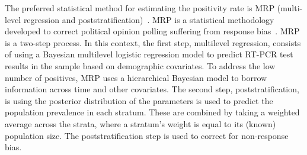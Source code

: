 \documentclass[thesis.tex]{subfiles}
\begin{document}
The preferred statistical method for estimating the positivity rate is MRP (multi-level regression and poststratification)~\autocite{cisMethodsONS,pouwelsCommunity}.
MRP is a statistical methodology developed to correct political opinion polling suffering from response bias~\autocite{gelmanMRT,gelmanPoststratication,parkMRP}.
MRP is a two-step process.
In this context, the first step, multilevel regression, consists of using a Bayesian multilevel logistic regression model to predict RT-PCR test results in the sample based on demographic covariates.
To address the low number of positives, MRP uses a hierarchical Bayesian model to borrow information across time and other covariates.
The second step, poststratification, is using the posterior distribution of the parameters is used to predict the population prevalence in each stratum.
These are combined by taking a weighted average across the strata, where a stratum's weight is equal to its (known) population size.
The poststratification step is used to correct for non-response bias.
\end{document}
